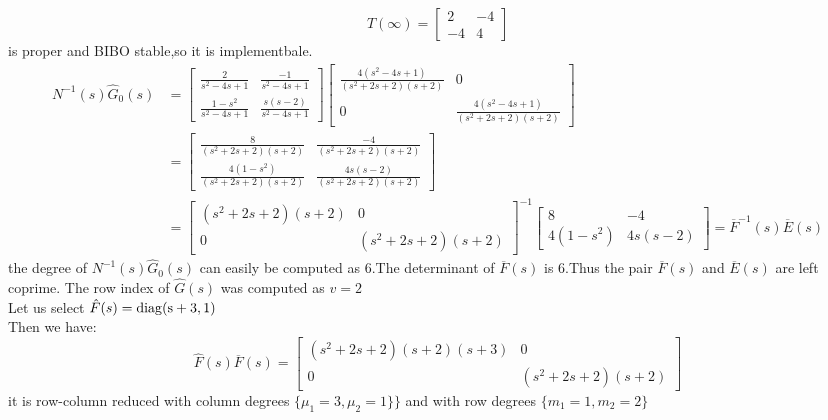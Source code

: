 \documentclass{article}
\begin{document}
\[ 
T(\infty)=\left[ 
    \begin{array}{cc}
        2 & -4\\
        -4 & 4
    \end{array}
\right] 
\]
is proper and BIBO stable,so it is implementbale. 
\[ 
\begin{split}
N^{-1}(s)\hat{G}_0(s)
& =\left[ 
    \begin{array}{cc}
        \frac{2}{s^2-4s+1} & \frac{-1}{s^2-4s+1}\\
        \frac{1-s^2}{s^2-4s+1} & \frac{s(s-2)}{s^2-4s+1}
    \end{array}
\right]
\left[ 
    \begin{array}{cc}
        \frac{4(s^2-4s+1)}{(s^2+2s+2)(s+2)} & 0\\
        0 & \frac{4(s^2-4s+1)}{(s^2+2s+2)(s+2)}
    \end{array}
\right]\\
& =\left[ 
    \begin{array}{cc}
        \frac{8}{(s^2+2s+2)(s+2)} & \frac{-4}{(s^2+2s+2)(s+2)}\\
        \frac{4(1-s^2)}{(s^2+2s+2)(s+2)} & \frac{4s(s-2)}{(s^2+2s+2)(s+2)}
    \end{array}
\right]\\
& =\left[ 
    \begin{array}{cc}
        (s^2+2s+2)(s+2) & 0\\
        0 & (s^2+2s+2)(s+2)
    \end{array}
\right]^{-1}\left[ 
    \begin{array}{cc}
        8 & -4 \\
        4(1-s^2) & 4s(s-2)
    \end{array}
\right]=\overline{F}^{-1}(s)\overline{E}(s)
\end{split}
\]
the degree of $N^{-1}(s)\hat{G}_0(s)$ can easily be computed as 6.The determinant of $\overline{F}(s)$ is 6.Thus the pair $\overline{F}(s)$ and $\overline{E}(s)$ are left coprime.
The row index of $\hat{G}(s)$ was computed as $v=2$\\
Let us select $\hat{F}(s)=\rm{diag}(s+3,1)$ \\
Then we have:
\[
 \hat{F}(s)\overline{F}(s)=
 \left[ 
     \begin{array}{cc}
     (s^2+2s+2)(s+2)(s+3) & 0\\
     0 & (s^2+2s+2)(s+2)
     \end{array}
 \right]   
\]
it is row-column reduced with column degrees $\{\mu_1=3,\mu_2=1\} \}$ and with row degrees $\{m_1=1,m_2=2\}$
\end{document}
